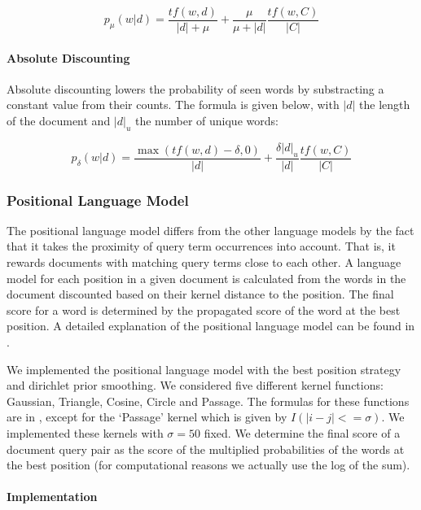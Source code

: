 \begin{equation*}
p_{\mu}(w | d) = \frac{tf(w,d)}{|d| + \mu}  + \frac{\mu}{\mu + |d|} \frac{tf(w,C)}{|C|}  
\end{equation*}


\paragraph{Absolute Discounting}

Absolute discounting lowers the probability of seen words by substracting a constant value from their counts.
The formula is given below, with $|d|$ the length of the document and $|d|_u$ the number of unique words:

\begin{equation*}
p_{\delta}(w | d) = \frac{\max(tf(w,d) - \delta, 0)}{|d|} + \frac{\delta |d|_{u}}{|d|} \frac{tf(w,C)}{|C|}  
\end{equation*}


\subsubsection{Positional Language Model}

The positional language model differs from the other
language models by the fact that it takes the proximity
of query term occurrences into account. That is,
it rewards documents with matching query terms
close to each other.
%
A language model for each position in a given document 
is calculated from the words in the document discounted
based on their kernel distance to the position.
The final score for a word is determined by the 
propagated score of the word at the best position.
A detailed explanation of the positional language model can 
be found in \cite{PLM}.

We implemented the positional language model
with the best position strategy and dirichlet prior smoothing.
We considered five different kernel functions:
Gaussian, Triangle, Cosine, Circle and Passage.
The formulas for these functions are in \cite{PLM},
except for the `Passage' kernel which
is given by $I(|i - j| <= \sigma)$.
We implemented these kernels with $\sigma = 50$ fixed.
We determine the final score of a document query pair
as the score of the multiplied probabilities of the words 
at the best position (for computational reasons we actually use 
the log of the sum). 


\paragraph{Implementation}

